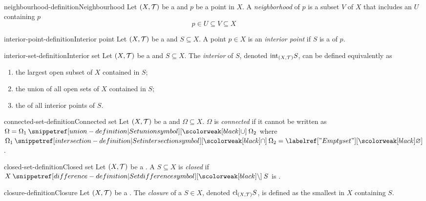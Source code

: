 \documentclass[preview]{standalone}
\begin{document}
\begin{snippetdefinition}{neighbourhood-definition}{Neighbourhood}
    Let \({(X, \mathcal{T})}\) be a \topologicalspace
    and \(p\) be a point in \(X\). A \textit{neighborhood} of \(p\) is a subset \(V\) of \(X\)
    that includes an  \(U\) containing \(p\)
    \[ p\in U \subseteq V \subseteq X \]
\end{snippetdefinition}

\begin{snippetdefinition}{interior-point-definition}{Interior point}
    Let \({(X, \mathcal{T})}\) be a \topologicalspace
    and \(S \subseteq X\). A point \(p \in X\) is an \textit{interior point} if \(S\) is a
    \neighborhood of \(p\).
\end{snippetdefinition}

\begin{snippetdefinition}{interior-set-definition}{Interior set}
    Let \({(X, \mathcal{T})}\) be a \topologicalspace
    and \(S \subseteq X\). The \textit{interior} of \(S\), denoted \({\text{int}}_{{(X, \mathcal{T})}} S\),
    can be defined equivalently as
    \begin{enumerate}
        \item the largest open subset of \(X\) contained in \(S\);
        \item the union of all open sets of \(X\) contained in \(S\);
        \item the \set of all interior points of \(S\).
    \end{enumerate}
\end{snippetdefinition}

\begin{snippetdefinition}{connected-set-definition}{Connected set}
    Let \({(X, \mathcal{T})}\) be a \topologicalspace
    and \(\Omega \subseteq X\). \(\Omega\) is \textit{connected} if it cannot be written as
    \(\Omega=\Omega_1 \union \Omega_2\) where \(\Omega_1 \intersection \Omega_2 = \emptyset\).
\end{snippetdefinition}

\begin{snippetdefinition}{closed-set-definition}{Closed set}
    Let \({(X, \mathcal{T})}\) be a \topologicalspace.
    A \set \(S \subseteq X\) is \textit{closed} if \(X \difference S\) is .
\end{snippetdefinition}

\begin{snippetdefinition}{closure-definition}{Closure}
    Let \({(X, \mathcal{T})}\) be a \topologicalspace.
    The \textit{closure} of a \set \(S\in X\), denoted \({\text{cl}}_{{(X, \mathcal{T})}} S\), is defined as
    the smallest \closedset in \(X\) containing \(S\).
\end{snippetdefinition}
\end{document}

